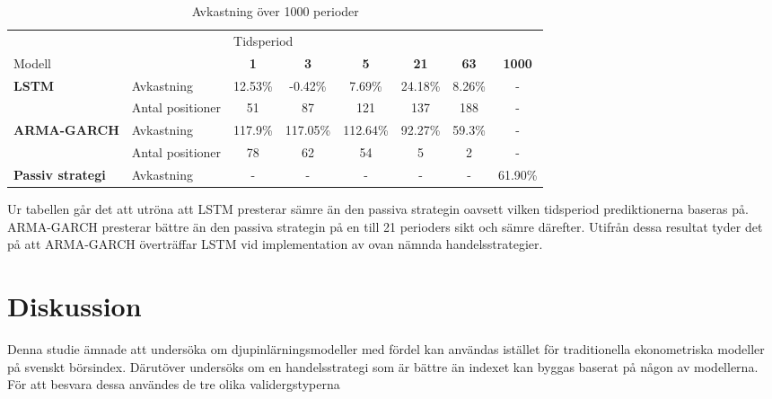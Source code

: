 \documentclass[11pt]{article}
\begin{document}
\begin{table}[H]
\centering
\caption{Avkastning över 1000 perioder}
\begin{adjustbox}{width=1\textwidth}
\begin{tabular}{||llcccccc||}
\hline
                                     &            & \multicolumn{6}{l||}{Tidsperiod}                                  \\
Modell                                 &            & \textbf{1} & \textbf{3} & \textbf{5} & \textbf{21} & \textbf{63} & \textbf{1000}\\ \hline\hline
\multirow{2}{*}{\textbf{LSTM}}  & Avkastning       & 12.53\%          & -0.42\%         & 7.69\%          & 24.18\%           & 8.26\%  & -     \\
                                & Antal positioner & 51          & 87         & 121          & 137            & 188 &  -        \\ \cline{2-8} 
\multirow{2}{*}{\textbf{ARMA-GARCH}}  & Avkastning       & 117.9\%        & 117.05\%       & 112.64\%        & 92.27\%          & 59.3\%       & - \\
                                & Antal positioner & 78        & 62       & 54        & 5          & 2     &   -
                                \\ \cline{2-8}
{\textbf{Passiv strategi}} & Avkastning &- &- &- &- &- & 61.90\% \\ \hline
\end{tabular}
\end{adjustbox}
\end{table}

Ur tabellen går det att utröna att LSTM presterar sämre än den passiva strategin oavsett vilken tidsperiod prediktionerna baseras på. ARMA-GARCH presterar bättre än den passiva strategin på en till 21 perioders sikt och sämre därefter. Utifrån dessa resultat tyder det på att ARMA-GARCH överträffar LSTM vid implementation av ovan nämnda handelsstrategier. 


\section{Diskussion}
Denna studie ämnade att undersöka om djupinlärningsmodeller med fördel kan användas istället för traditionella ekonometriska modeller på svenskt börsindex. Därutöver undersöks om en handelsstrategi som är bättre än indexet kan byggas baserat på någon av modellerna. För att besvara dessa användes de tre olika validergstyperna
\end{document}

